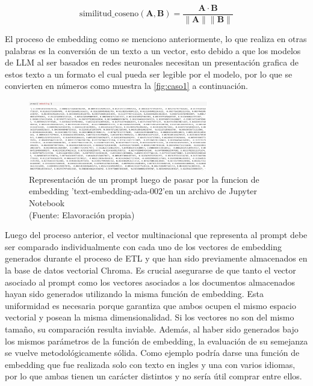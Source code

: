 \begin{equation}
    \text{similitud\_coseno}(\mathbf{A}, \mathbf{B}) = \frac{\mathbf{A} \cdot \mathbf{B}}{\|\mathbf{A}\| \|\mathbf{B}\|}
    \label{eq:similitudcoseno}
\end{equation}


\newpage

El proceso de embedding como se menciono anteriormente, lo que realiza en otras palabras es la conversión de un texto a un vector, esto debido a que los modelos de LLM al ser basados 
en redes neuronales necesitan un presentación grafica de estos texto a un formato el cual pueda ser legible por el modelo, por lo que se convierten en números como muestra la 
\autoref{fig:caso1} a continuación. 

\begin{figure}[ht!]
    \centering
    \includegraphics[width=0.7\textwidth]{figures/embedding1.png}
    \caption[Representación vectorial de un prompt luego de pasar por la funcion de embedding]{Representación de un prompt luego de pasar por la funcion de embedding 'text-embedding-ada-002'en un archivo de Jupyter Notebook\\
    {\scriptsize (Fuente: Elavoración propia)}}
    \label{fig:caso1}
\end{figure}


Luego del proceso anterior, el vector multinacional que representa al prompt debe ser comparado individualmente con cada uno de los 
vectores de embedding generados durante el proceso de ETL y que han sido previamente almacenados en la base de datos vectorial Chroma. 
Es crucial asegurarse de que tanto el vector asociado al prompt como los vectores asociados a los documentos almacenados hayan 
sido generados utilizando la misma función de embedding. Esta uniformidad es necesaria porque garantiza que ambos ocupen el mismo 
espacio vectorial y posean la misma dimensionalidad. Si los vectores no son del mismo tamaño, su comparación resulta inviable. 
Además, al haber sido generados bajo los mismos parámetros de la función de embedding, la evaluación de su semejanza se vuelve 
metodológicamente sólida. Como ejemplo podría darse una función de embedding que fue realizada solo con texto en ingles y una con 
varios idiomas, por lo que ambas tienen un carácter distintos y no sería útil comprar entre ellos.

